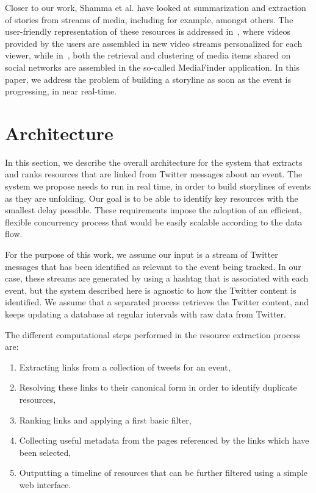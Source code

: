 \documentclass{sig-alternate}
\begin{document}
Closer to our work, Shamma et al. \cite{Shamma:ICWSM10} have looked at summarization and extraction of stories from streams of media, including for example, \cite{Lin:ICME09,Shamma:CSCW11} amongst others. The user-friendly representation of these resources is addressed in~\cite{cesar:HT11}, where videos provided by the users are assembled in new video streams personalized for each viewer, while in~\cite{Rizzo:SAM12}, both the retrieval and clustering of media items shared on social networks are assembled in the so-called MediaFinder application. In this paper, we address the problem of building a storyline as soon as the event is progressing, in near real-time.


\section{Architecture}
\label{sec:architecture}
In this section, we describe the overall architecture for the system that extracts and ranks resources that are linked from Twitter messages about an event. The system we propose needs to run in real time, in order to build storylines of events as they are unfolding. Our goal is to be able to identify key resources with the smallest delay possible. These requirements impose the adoption of an efficient, flexible concurrency process that would be easily scalable according to the data flow.

For the purpose of this work, we assume our input is a stream of Twitter messages that has been identified as relevant to the event being tracked. In our case, these streams are generated by using a hashtag that is associated with each event, but the system described here is agnostic to how the Twitter content is identified. We assume that a separated process retrieves the Twitter content, and keeps updating a database at regular intervals with raw data from Twitter.

The different computational steps performed in the resource extraction process are:
\begin{enumerate}
 \item Extracting links from a collection of tweets for an event,
 \item Resolving these links to their canonical form in order to identify duplicate resources,
 \item Ranking links and applying a first basic filter,
 \item Collecting useful metadata from the pages referenced by the links which have been selected,
 \item Outputting a timeline of resources that can be further filtered using a simple web interface.
\end{enumerate}
\end{document}
